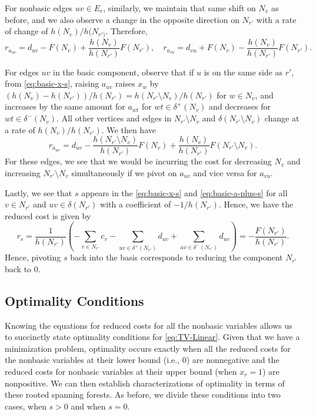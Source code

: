 \documentclass[titlepage,11pt]{article}
\begin{document}
For nonbasic edges $uv \in E_r$, similarly, we maintain that same shift on $N_v$ as before, and we also observe a change in the opposite direction on $N_{r'}$ with a rate of change of $h(N_v)/h(N_{r')}$. Therefore,
\begin{equation}\label{eq:reduced-cost-edge-plus-s}
    r_{a_{uv}} = d_{uv} - F(N_v) + \frac{h(N_v)}{h(N_{r'})}F(N_{r'}), \quad r_{a_{vu}} = d_{vu} + F(N_v) - \frac{h(N_v)}{h(N_{r'})}F(N_{r'}).
\end{equation}


For edges $uv$ in the basic component, observe that if $u$ is on the same side as $r'$, from \eqref{eq:basic-x-s}, raising $a_{uv}$ raises $x_w$ by $(h(N_v) - h(N_{r'}))/h(N_{r'}) = h(N_{r'}\setminus N_v)/h(N_{r'})$ for $w \in N_v$, and increases by the same amount for $a_{wt}$ for $wt \in \delta^+(N_v)$ and decreases for $wt \in \delta^-(N_v)$. All other vertices and edges in $N_{r'}\setminus N_v$ and $\delta(N_{r'}\setminus N_v)$ change at a rate of $h(N_v)/h(N_{r'})$. We then have
\begin{equation}
    r_{a_{uv}} = d_{uv} - \frac{h(N_{r'}\setminus N_v)}{h(N_{r'})}F(N_v) + \frac{h(N_v)}{h(N_{r'})}F(N_{r'}\setminus N_v).
\end{equation}
For these edges, we see that we would be incurring the cost for decreasing $N_v$ and increasing $N_{r'} \setminus N_v$ simultaneously if we pivot on $a_{uv}$ and vice versa for $a_{vu}$.

Lastly, we see that $s$ appears in the \eqref{eq:basic-x-s} and \eqref{eq:basic-a-plus-s} for all $v \in N_{r'}$ and $uv \in \delta(N_{r'})$ with a coefficient of $-1/h(N_{r'})$. Hence, we have the reduced cost is given by
\begin{equation}\label{eq:reduced-cost-s}
    r_s = \frac{1}{h(N_{r'})}\left(-\sum_{v \in N_{r'}}c_v - \sum_{uv \in \delta^+(N_{r'})}d_{uv} + \sum_{uv \in \delta^-(N_{r'})}d_{uv}\right) = -\frac{F(N_{r'})}{h(N_{r'})}.
\end{equation}
Hence, pivoting $s$ back into the basis corresponds to reducing the component $N_{r'}$ back to 0.

\subsection{Optimality Conditions}
Knowing the equations for reduced costs for all the nonbasic variables allows us to succinctly state optimality conditions for \eqref{eq:TV-Linear}. Given that we have a minimization problem, optimality occurs exactly when all the reduced costs for the nonbasic variables at their lower bound (i.e., 0) are nonnegative and the reduced costs for nonbasic variables at their upper bound (when $x_r = 1$) are nonpositive. We can then establish characterizations of optimality in terms of these rooted spanning forests. As before, we divide these conditions into two cases, when $s > 0$ and when $s = 0$.
\end{document}
